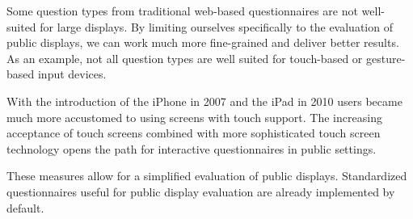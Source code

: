 
	Some question types from traditional web-based questionnaires are not well-suited for large displays. By limiting ourselves specifically to the evaluation of public displays, we can work much more fine-grained and deliver better results. As an example, not all question types are well suited for touch-based or gesture-based input devices. 

	With the introduction of the iPhone in 2007 and the iPad in 2010 users became much more accustomed to using screens with touch support. The increasing acceptance of touch screens combined with more sophisticated touch screen technology opens the path for interactive questionnaires in public settings. 

	These measures allow for a simplified evaluation of public displays. Standardized questionnaires useful for public display evaluation are already implemented by default.







